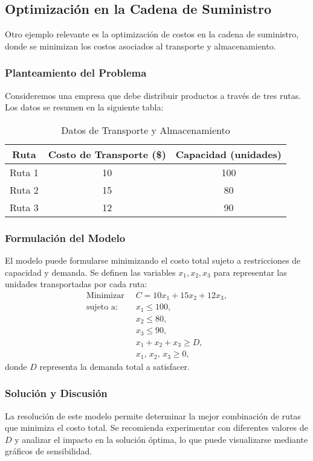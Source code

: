 	\subsection{Optimización en la Cadena de Suministro}
	Otro ejemplo relevante es la optimización de costos en la cadena de suministro, donde se minimizan los costos asociados al transporte y almacenamiento.
	
	\subsubsection{Planteamiento del Problema}
	Consideremos una empresa que debe distribuir productos a través de tres rutas. Los datos se resumen en la siguiente tabla:
	
	\begin{table}[H]
		\centering
		\caption{Datos de Transporte y Almacenamiento}
		\begin{tabular}{|c|c|c|}
			\hline
			\textbf{Ruta} & \textbf{Costo de Transporte (\$)} & \textbf{Capacidad (unidades)} \\
			\hline
			Ruta 1 & 10 & 100 \\
			Ruta 2 & 15 & 80 \\
			Ruta 3 & 12 & 90 \\
			\hline
		\end{tabular}
	\end{table}
	
	\subsubsection{Formulación del Modelo}
	El modelo puede formularse minimizando el costo total sujeto a restricciones de capacidad y demanda. Se definen las variables \( x_1, x_2, x_3 \) para representar las unidades transportadas por cada ruta:
	\[
	\begin{aligned}
		\text{Minimizar } & C = 10x_1 + 15x_2 + 12x_3,\\[1mm]
		\text{sujeto a: } \quad & x_1 \leq 100,\\[1mm]
		& x_2 \leq 80,\\[1mm]
		& x_3 \leq 90,\\[1mm]
		& x_1 + x_2 + x_3 \geq D,\\[1mm]
		& x_1,\, x_2,\, x_3 \geq 0,
	\end{aligned}
	\]
	donde \( D \) representa la demanda total a satisfacer.
	
	\subsubsection{Solución y Discusión}
	La resolución de este modelo permite determinar la mejor combinación de rutas que minimiza el costo total. Se recomienda experimentar con diferentes valores de \( D \) y analizar el impacto en la solución óptima, lo que puede visualizarse mediante gráficos de sensibilidad.
